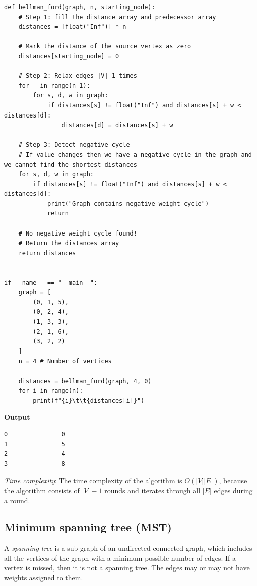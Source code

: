 \documentclass[a4paper,11pt]{book}
\begin{document}
\begin{lstlisting}
def bellman_ford(graph, n, starting_node):
    # Step 1: fill the distance array and predecessor array
    distances = [float("Inf")] * n

    # Mark the distance of the source vertex as zero
    distances[starting_node] = 0

    # Step 2: Relax edges |V|-1 times
    for _ in range(n-1):
        for s, d, w in graph:
            if distances[s] != float("Inf") and distances[s] + w < distances[d]:
                distances[d] = distances[s] + w

    # Step 3: Detect negative cycle
    # If value changes then we have a negative cycle in the graph and we cannot find the shortest distances
    for s, d, w in graph:
        if distances[s] != float("Inf") and distances[s] + w < distances[d]:
            print("Graph contains negative weight cycle")
            return

    # No negative weight cycle found!
    # Return the distances array
    return distances


if __name__ == "__main__":
    graph = [
        (0, 1, 5),
        (0, 2, 4),
        (1, 3, 3),
        (2, 1, 6),
        (3, 2, 2)
    ]
    n = 4 # Number of vertices

    distances = bellman_ford(graph, 4, 0)
    for i in range(n):
        print(f"{i}\t\t{distances[i]}")
\end{lstlisting}
\textbf{Output}
\begin{lstlisting}
0               0
1               5
2               4
3               8
\end{lstlisting}
\noindent \textit{Time complexity}: The time complexity of the algorithm is $O(|V||E|)$, because the algorithm consists of
$|V|-1$ rounds and iterates through all $|E|$ edges during a round.

\subsection{Minimum spanning tree (MST)}

\noindent A \textit{spanning tree} is a sub-graph of an undirected connected graph, which includes all the vertices of the graph with a minimum possible number of edges. If a vertex is missed, then it is not a spanning tree. The edges may or may not have weights assigned to them. 
\end{document}

